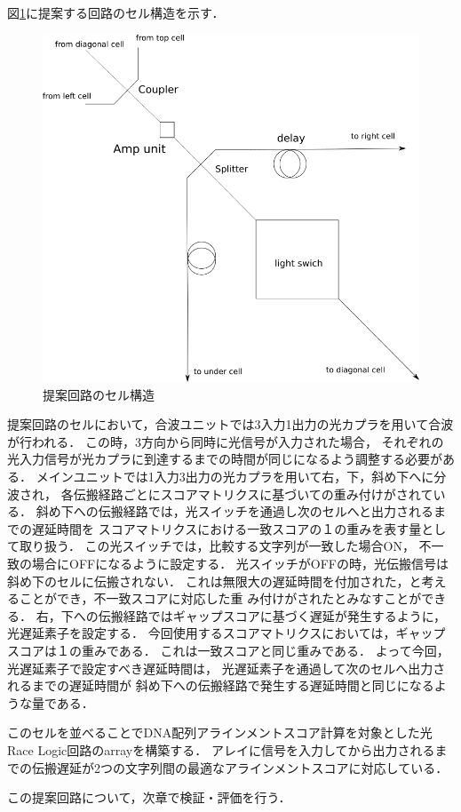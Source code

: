 図\ref{fig:proposalcell}に提案する回路のセル構造を示す．
\begin{figure}[t!]
\begin{center}
\includegraphics[keepaspectratio,scale=0.5]{fig/3/lightracelogic_cell_6.png}
\caption{提案回路のセル構造}
\label{fig:proposalcell}
\end{center}
\end{figure}
提案回路のセルにおいて，合波ユニットでは3入力1出力の光カプラを用いて合波が行われる．
この時，3方向から同時に光信号が入力された場合，
それぞれの光入力信号が光カプラに到達するまでの時間が同じになるよう調整する必要がある．
メインユニットでは1入力3出力の光カプラを用いて右，下，斜め下へに分波され，
各伝搬経路ごとにスコアマトリクスに基づいての重み付けがされている．
斜め下への伝搬経路では，光スイッチを通過し次のセルへと出力されるまでの遅延時間を
スコアマトリクスにおける一致スコアの１の重みを表す量として取り扱う．
この光スイッチでは，比較する文字列が一致した場合ON，
不一致の場合にOFFになるように設定する．
光スイッチがOFFの時，光伝搬信号は斜め下のセルに伝搬されない．
これは無限大の遅延時間を付加された，と考えることができ，不一致スコアに対応した重
み付けがされたとみなすことができる．
右，下への伝搬経路ではギャップスコアに基づく遅延が発生するように，
光遅延素子を設定する．
今回使用するスコアマトリクスにおいては，ギャップスコアは１の重みである．
これは一致スコアと同じ重みである．
よって今回，光遅延素子で設定すべき遅延時間は，
光遅延素子を通過して次のセルへ出力されるまでの遅延時間が
斜め下への伝搬経路で発生する遅延時間と同じになるような量である．

このセルを並べることでDNA配列アラインメントスコア計算を対象とした光Race Logic回路のarrayを構築する．
アレイに信号を入力してから出力されるまでの伝搬遅延が2つの文字列間の最適なアラインメントスコアに対応している．

この提案回路について，次章で検証・評価を行う．
